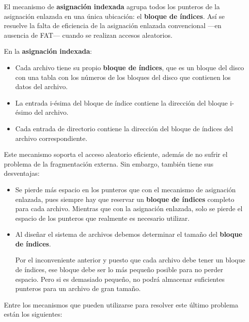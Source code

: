 {} El mecanismo de \textbf{asignación indexada} agrupa todos los
punteros de la asignación enlazada en una única ubicación: el
\textbf{bloque de índices}{}. Así se resuelve la falta de eficiencia de
la asignación enlazada convencional ---en ausencia de FAT--- cuando se
realizan accesos aleatorios.

En la \textbf{asignación indexada}:

\begin{itemize}
\item
  Cada archivo tiene su propio \textbf{bloque de índices}, que es un
  bloque del disco con una tabla con los números de los bloques del
  disco que contienen los datos del archivo.
\item
  La entrada i-ésima del bloque de índice contiene la dirección del
  bloque i-ésimo del archivo.
\item
  Cada entrada de directorio contiene la dirección del bloque de índices
  del archivo correspondiente.
\end{itemize}

Este mecanismo soporta el acceso aleatorio eficiente, además de no
sufrir el problema de la fragmentación externa. Sin embargo, también
tiene sus desventajas:

\begin{itemize}
\item
  Se pierde más espacio en los punteros que con el mecanismo de
  asignación enlazada, pues siempre hay que reservar un \textbf{bloque
  de índices} completo para cada archivo. Mientras que con la asignación
  enlazada, solo se pierde el espacio de los punteros que realmente es
  necesario utilizar.
\item
  Al diseñar el sistema de archivos debemos determinar el tamaño del
  \textbf{bloque de índices}.

  Por el inconveniente anterior y puesto que cada archivo debe tener un
  bloque de índices, ese bloque debe ser lo más pequeño posible para no
  perder espacio. Pero si es demasiado pequeño, no podrá almacenar
  suficientes punteros para un archivo de gran tamaño.
\end{itemize}

Entre los mecanismos que pueden utilizarse para resolver este último
problema están los siguientes:

